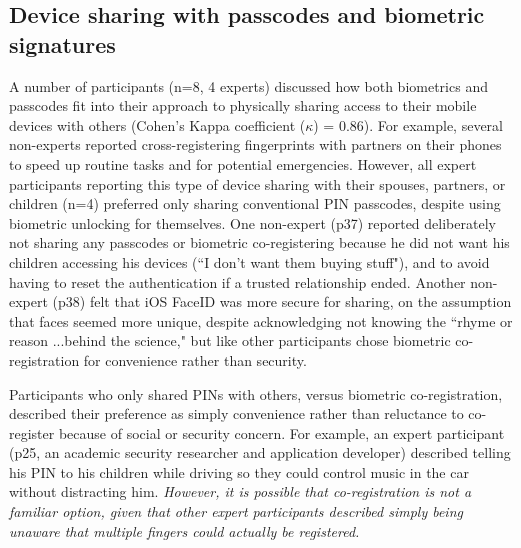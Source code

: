 \subsection{Device sharing with passcodes and biometric signatures}
A number of participants (n=8, 4 experts) discussed how both biometrics and
passcodes fit into their approach to physically sharing access to their
mobile devices with others (Cohen's Kappa coefficient (\(\kappa\)) = 0.86). For
example, several non-experts reported cross-registering fingerprints with
partners on their phones to speed up routine tasks and for potential
emergencies. However, all expert participants reporting this type of device
sharing with their spouses, partners, or children (n=4) preferred only sharing
conventional PIN passcodes, despite using biometric unlocking for
themselves. One non-expert (p37) reported deliberately not sharing any passcodes
or biometric co-registering because he did not want his children accessing his
devices (``I don't want them buying stuff"), and to avoid having to reset the
authentication if a trusted relationship ended. Another non-expert (p38) felt
that iOS FaceID was more secure for sharing, on the assumption that faces seemed
more unique, despite acknowledging not knowing the ``rhyme or reason ...behind
the science," but like other participants chose biometric co-registration for
convenience rather than
security. %

Participants who only shared PINs with others, versus biometric co-registration,
described their preference as simply convenience rather than reluctance to
co-register because of social or security concern. For example, an expert
participant (p25, an academic security researcher and application developer)
described telling his PIN to his children while driving so they could control
music in the car without distracting him. {\em However, it is possible that
co-registration is not a familiar option, given that other expert participants
described simply being unaware that multiple fingers could actually be
registered.}

